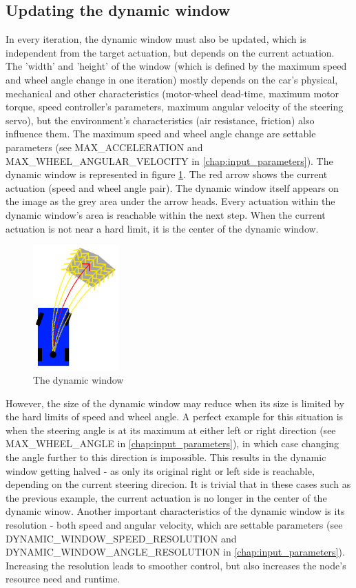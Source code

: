 \subsection{Updating the dynamic window}
In every iteration, the dynamic window must also be updated, which is independent from the target actuation, but depends on the current actuation. The 'width' and 'height' of the window (which is defined by the maximum speed and wheel angle change in one iteration) mostly depends on the car's physical, mechanical and other characteristics (motor-wheel dead-time, maximum motor torque, speed controller's parameters, maximum angular velocity of the steering servo), but the environment's characteristics (air resistance, friction) also influence them. The maximum speed and wheel angle change are settable parameters (see MAX\_ACCELERATION and MAX\_WHEEL\_ANGULAR\_VELOCITY in \ref{chap:input_parameters}). The dynamic window is represented in figure \ref{dynamic_window}. The red arrow shows the current actuation (speed and wheel angle pair). The dynamic window itself appears on the image as the grey area under the arrow heads. Every actuation within the dynamic window's area is reachable within the next step. When the current actuation is not near a hard limit, it is the center of the dynamic window.

\begin{figure}[!ht]
    \centering
    \includegraphics[height=48mm]{figures/raw/dynamic_window.png}
    \caption{The dynamic window}
    \label{dynamic_window}
\end{figure}

However, the size of the dynamic window may reduce when its size is limited by the hard limits of speed and wheel angle. A perfect example for this situation is when the steering angle is at its maximum at either left or right direction (see MAX\_WHEEL\_ANGLE in \ref{chap:input_parameters}), in which case changing the angle further to this direction is impossible. This results in the dynamic window getting halved - as only its original right or left side is reachable, depending on the current steering direcion. It is trivial that in these cases such as the previous example, the current actuation is no longer in the center of the dynamic winow.
Another important characteristics of the dynamic window is its resolution - both speed and angular velocity, which are settable parameters (see DYNAMIC\_WINDOW\_SPEED\_RESOLUTION and DYNAMIC\_WINDOW\_ANGLE\_RESOLUTION in \ref{chap:input_parameters}). Increasing the resolution leads to smoother control, but also increases the node's resource need and runtime.

